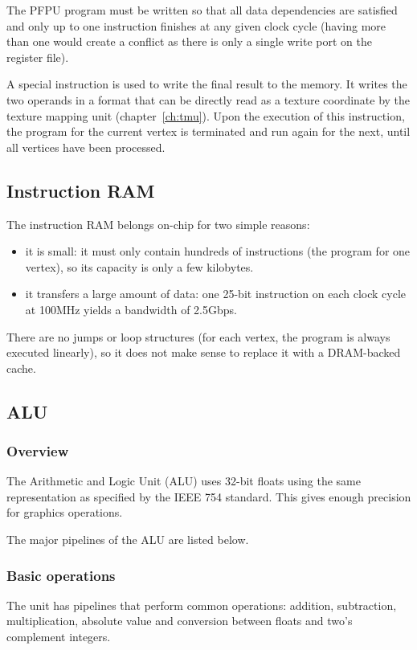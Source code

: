 \documentclass[a4paper,11pt]{kthesis}
\begin{document}
The PFPU program must be written so that all data dependencies are satisfied and only up to one instruction finishes at any given clock cycle (having more than one would create a conflict as there is only a single write port on the register file).

A special instruction is used to write the final result to the memory. It writes the two operands in a format that can be directly read as a texture coordinate by the texture mapping unit (chapter~\ref{ch:tmu}). Upon the execution of this instruction, the program for the current vertex is terminated and run again for the next, until all vertices have been processed.

\subsection{Instruction RAM}
The instruction RAM belongs on-chip for two simple reasons:
\begin{itemize}
\item it is small: it must only contain hundreds of instructions (the program for one vertex), so its capacity is only a few kilobytes.
\item it transfers a large amount of data: one 25-bit instruction on each clock cycle at 100MHz yields a bandwidth of 2.5Gbps.
\end{itemize}
There are no jumps or loop structures (for each vertex, the program is always executed linearly), so it does not make sense to replace it with a DRAM-backed cache.

\subsection{ALU}
\subsubsection{Overview}
The Arithmetic and Logic Unit (ALU) uses 32-bit floats using the same representation as specified by the IEEE 754 standard. This gives enough precision for graphics operations.

The major pipelines of the ALU are listed below.

\subsubsection{Basic operations}
The unit has pipelines that perform common operations: addition, subtraction, multiplication, absolute value and conversion between floats and two's complement integers.
\end{document}
